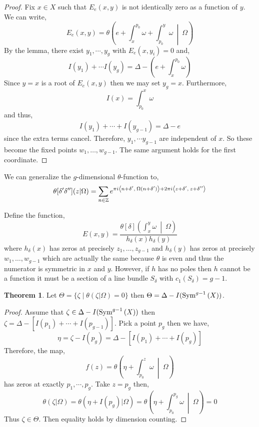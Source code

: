 \documentclass[12pt]{extarticle}
\newcommand{\Z}{\mathbb{Z}}
\theoremstyle{definition}
\newtheorem{theorem}{Theorem}[section]
\newenvironment{definition}[1][Definition:]{\begin{trivlist}
\item[\hskip \labelsep {\bfseries #1}]}{\end{trivlist}}
\begin{document}
\begin{proof}
Fix $x \in X$ such that $E_e(x, y)$ is not identically zero as a function of $y$. We can write,
\[ E_e(x, y) = \theta\left( e + \int_x^{p_0} \omega + \int_{p_0}^y \omega \: \middle| \: \Omega \right) \]
By the lemma, there exist $y_1, \cdots, y_g$ with $E_e(x, y_i) = 0$ and,
\[ I(y_1) + \cdots I(y_g) = \Delta -  \left( e + \int_x^{p_0} \omega \right) \]
Since $y = x$ is a root of $E_e(x, y)$ then we may set $y_g = x$. Furthermore, 
\[ I(x) = \int_{p_0}^x \omega \]
and thus,
\[ I(y_1) + \cdots + I(y_{g-1}) = \Delta - e \]
since the extra terms cancel. Therefore, $y_1, \cdots y_{g-1}$ are independent of $x$. So these become the fixed points $w_1, \dots, w_{g-1}$. The same argument holds for the first coordinate. 
\end{proof}

\begin{definition}
We can generalize the $g$-dimensional $\theta$-function to,
\[ \theta[\delta' \delta''](z | \Omega) = \sum_{n \in \Z} e^{\pi i \inner{n + \delta'}{\: \Omega(n + \delta')} +  2 \pi i \inner{z + \delta'}{\: z + \delta''}} \]
\end{definition}

\begin{definition}
Define the function,
\[ E(x,y) = \frac{\theta[\delta]\left( \int_x^y \omega \: \middle| \: \Omega \right)}{h_\delta(x) h_\delta(y)} \]
where $h_{\delta}(x)$ has zeros at precisely $z_1, \dots, z_{g - 1}$ and $h_{\delta}(y)$ has zeros at precisely $w_1, \dots, w_{g-1}$ which are actually the same because $\theta$ is even and thus the numerator is symmetric in $x$ and $y$. However, if $h$ has no poles then $h$ cannot be a function it must be a section of a line bundle $S_{\delta}$ with $c_1(S_{\delta}) = g-1$.    
\end{definition}

\begin{theorem}
Let $\Theta = \{ \zeta \mid \theta(\zeta | \Omega) = 0 \}$ then $\Theta = \Delta - I(\mathrm{Sym}^{g-1}\left(X\right))$. 
\end{theorem}

\begin{proof}
Assume that $\zeta \in \Delta - I(\mathrm{Sym}^{g-1}\left(X\right))$ then $\zeta = \Delta - [I(p_1) + \cdots + I(p_{g-1})]$. Pick a point $p_g$ then we have,
\[ \eta = \zeta - I(p_g) = \Delta - [I(p_1) + \cdots + I(p_{g})] \]
Therefore, the map,
\[ f(z) = \theta\left( \eta + \int_{p_0}^z \omega \: \middle| \: \Omega \right) \]
has zeros at exactly $p_1, \cdots, p_g$. Take $z = p_g$ then,
\[ \theta(\zeta | \Omega) = \theta(\eta + I(p_g) | \Omega) = \theta\left( \eta + \int_{p_0}^{p_g} \omega \: \middle| \: \Omega \right) = 0 \]
Thus $\zeta \in \Theta$. Then equality holds by dimension counting.
\end{proof}
\end{document}
